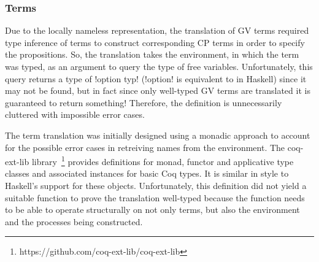 \subsubsection{Terms}

Due to the locally nameless representation, the translation of GV terms
required type inference of terms to construct corresponding CP terms in order
to specify the propositions. So, the translation takes the environment, in
which the term was typed, as an argument to query the type of free
variables. Unfortunately, this query returns a type of \coqe!option typ!
(\coqe!option! is equivalent to  in Haskell) since it may not be
found, but in fact since only well-typed GV terms are translated it is
guaranteed to return something! Therefore, the definition is unnecessarily
cluttered with impossible error cases.

The term translation was initially designed using a monadic approach to
account for the possible error cases in retreiving names from the
environment. The coq-ext-lib
library~\footnote{https://github.com/coq-ext-lib/coq-ext-lib} provides
definitions for monad, functor and applicative type classes and associated
instances for basic Coq types. It is similar in style to Haskell's support for
these objects. Unfortunately, this definition did not yield a suitable
function to prove the translation well-typed because the function needs to be
able to operate structurally on not only terms, but also the environment and
the processes being constructed.

